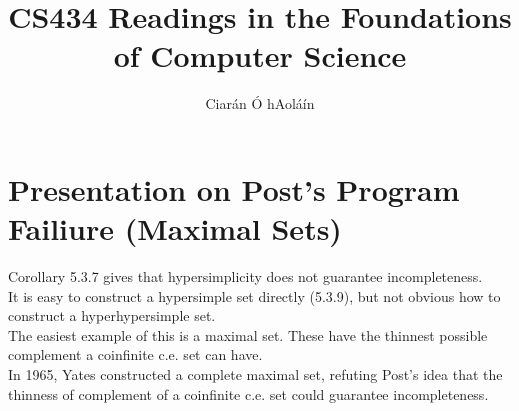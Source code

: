 \documentclass{article}
\title{CS434 Readings in the Foundations of Computer Science}
\author{Ciarán Ó hAoláín}
\theoremstyle{definition}
\theoremstyle{remark}
\theoremstyle{example}
\begin{document}
	\maketitle
	\section*{Presentation on Post's Program Failiure (Maximal Sets)}
	Corollary 5.3.7 gives that hypersimplicity does not guarantee incompleteness.\\
	It is easy to construct a hypersimple set directly (5.3.9), but not obvious how to construct a hyperhypersimple set.\\
	The easiest example of this is a maximal set. These have the thinnest possible complement a coinfinite c.e. set can have.\\
	In 1965, Yates constructed a complete maximal set, refuting Post's idea that the thinness of complement of a coinfinite c.e. set could guarantee incompleteness.
	
\end{document}

